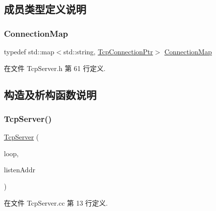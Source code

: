 \subsection{成员类型定义说明}
\mbox{\label{classmuduo_1_1TcpServer_a757ed86be3708eee03ff754c5108abdd}} 
\subsubsection{\texorpdfstring{Connection\+Map}{ConnectionMap}}
{\footnotesize\ttfamily typedef std\+::map$<$std\+::string, \hyperlink{namespacemuduo_a40c45128e9700d337d92f3cbb8dd4a0a}{Tcp\+Connection\+Ptr}$>$ \hyperlink{classmuduo_1_1TcpServer_a757ed86be3708eee03ff754c5108abdd}{Connection\+Map}\hspace{0.3cm}{\ttfamily [private]}}



在文件 Tcp\+Server.\+h 第 61 行定义.



\subsection{构造及析构函数说明}
\mbox{\label{classmuduo_1_1TcpServer_aca9a1702da801c3275b2e70d233cc0c7}} 
\subsubsection{\texorpdfstring{Tcp\+Server()}{TcpServer()}}
{\footnotesize\ttfamily \hyperlink{classmuduo_1_1TcpServer}{Tcp\+Server} (\begin{DoxyParamCaption}\item[{\hyperlink{classmuduo_1_1EventLoop}{Event\+Loop} $\ast$}]{loop,  }\item[{const \hyperlink{classmuduo_1_1InetAddress}{Inet\+Address} \&}]{listen\+Addr }\end{DoxyParamCaption})}



在文件 Tcp\+Server.\+cc 第 13 行定义.



